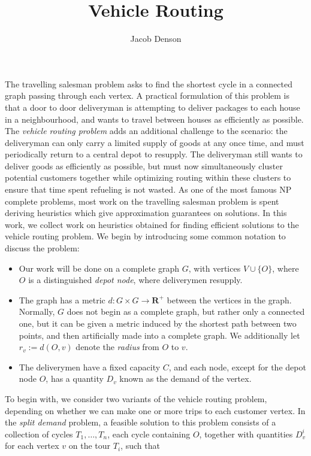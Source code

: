 \documentclass{article}
\title{Vehicle Routing}
\author{Jacob Denson}
\theoremstyle{plain}
\begin{document}
\maketitle

\tableofcontents

\newpage

The travelling salesman problem asks to find the shortest cycle in a connected graph passing through each vertex. A practical formulation of this problem is that a door to door deliveryman is attempting to deliver packages to each house in a neighbourhood, and wants to travel between houses as efficiently as possible. The {\it vehicle routing problem} adds an additional challenge to the scenario: the deliveryman can only carry a limited supply of goods at any once time, and must periodically return to a central depot to resupply. The deliveryman still wants to deliver goods as efficiently as possible, but must now simultaneously cluster potential customers together while optimizing routing within these clusters to ensure that time spent refueling is not wasted. As one of the most famous NP complete problems, most work on the travelling salesman problem is spent deriving heuristics which give approximation guarantees on solutions. In this work, we collect work on heuristics obtained for finding efficient solutions to the vehicle routing problem. We begin by introducing some common notation to discuss the problem:
%
\begin{itemize}
    \item Our work will be done on a complete graph $G$, with vertices $V \cup \{ O \}$, where $O$ is a distinguished {\it depot node}, where deliverymen resupply.

    \item The graph has a metric $d: G \times G \to \mathbf{R}^+$ between the vertices in the graph. Normally, $G$ does not begin as a complete graph, but rather only a connected one, but it can be given a metric induced by the shortest path between two points, and then artificially made into a complete graph. We additionally let $r_v := d(O,v)$ denote the {\it radius} from $O$ to $v$.

    \item The deliverymen have a fixed capacity $C$, and each node, except for the depot node $O$, has a quantity $D_v$ known as the demand of the vertex.
\end{itemize}
%
To begin with, we consider two variants of the vehicle routing problem, depending on whether we can make one or more trips to each customer vertex. In the {\it split demand} problem, a feasible solution to this problem consists of a collection of cycles $T_1, \dots, T_n$, each cycle containing $O$, together with quantities $D^i_v$ for each vertex $v$ on the tour $T_i$, such that
\end{document}
